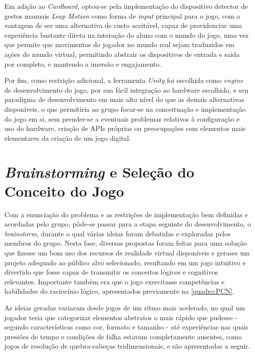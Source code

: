 Em adição ao \textit{Cardboard}, optou-se pela implementação do dispositivo 
detector de gestos manuais \textit{Leap Motion} como forma de \textit{input}
principal para o jogo, com a vantagem de ser uma alternativa de custo 
aceitável, capaz de providenciar uma experiência bastante direta na interação 
do aluno com o mundo do jogo, uma vez que permite que movimentos do jogador no 
mundo real sejam traduzidos em ações do mundo virtual, permitindo abstrair os 
dispositivos de entrada e saída por completo, e mantendo a imersão e engajamento.

Por fim, como restrição adicional, a ferramenta \textit{Unity} foi escolhida 
como \textit{engine} de desenvolvimento do jogo, por sua fácil integração 
ao hardware escolhido, e seu paradigma de desenvolvimento em mais alto nível do 
que as demais alternativas disponíveis, o que permitiria ao grupo focar-se 
na conceituação e implementação do jogo em si, sem prender-se a eventuais 
problemas relativos à configuração e uso do hardware, criação de APIs próprias 
ou preocupações com elementos mais elementares da criação de um jogo digital.

\section{\textit{Brainstorming} e Seleção do Conceito do Jogo}\label{sec-brainstorming-conceito}

Com a enunciação do problema e as restrições de implementação bem definidas 
e acordadas pelo grupo, pôde-se passar para a etapa seguinte do desenvolvimento, 
o \textit{brainstorm}, durante o qual várias ideias foram debatidas e 
exploradas pelos membros do grupo. Nesta fase, diversas propostas foram feitas 
para uma solução que fizesse um bom uso dos recursos de realidade 
virtual disponíveis e gerasse um projeto adequado ao público alvo 
selecionado, resultando em um jogo intuitivo e divertido que fosse 
capaz de transmitir os conceitos lógicos e cognitivos relevantes.
Importante também era que o jogo exercitasse competências e 
habilidades do raciocínio lógico, apresentados previamente na 
\autoref{quadro:PCN}.

As ideias geradas variaram desde jogos de um ritmo mais acelerado, no qual 
um jogador teria que categorizar elementos abstratos o mais rápido que 
pudesse - segundo características como cor, formato e tamanho - até experiências 
nas quais pressões de tempo e condições de falha estavam completamente 
ausentes, como jogos de resolução de quebra-cabeças tridimensionais, 
e são apresentadas a seguir.

